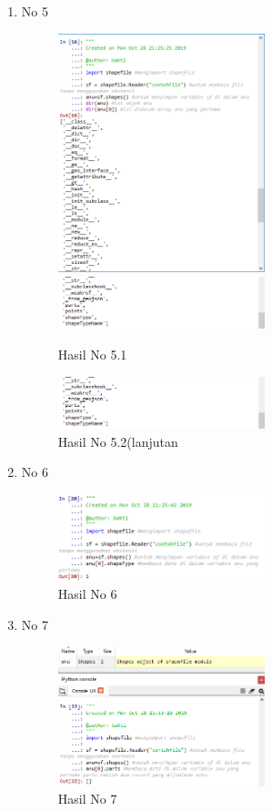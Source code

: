 \begin{enumerate}
	\item No 5
	
	\begin{figure}[H]
		\includegraphics[width=6cm]{figures/Tugas3/1174083/pictureNo5v1.png}
		\includegraphics[width=6cm]{figures/Tugas3/1174083/pictureNo5v2.png}
		\centering
		\caption{Hasil No 5.1}
	\end{figure}
	\begin{figure}[H]
		\includegraphics[width=6cm]{figures/Tugas3/1174083/pictureNo5v2.png}
		\centering
		\caption{Hasil No 5.2(lanjutan}
	\end{figure}
	
	\item No 6
	
	\begin{figure}[H]
		\includegraphics[width=6cm]{figures/Tugas3/1174083/pictureNo6.png}
		\centering
		\caption{Hasil No 6}
	\end{figure}
	
	\item No 7
	
	\begin{figure}[H]
		\includegraphics[width=6cm]{figures/Tugas3/1174083/pictureNo7.png}
		\centering
		\caption{Hasil No 7}
	\end{figure}
	

\end{enumerate}
